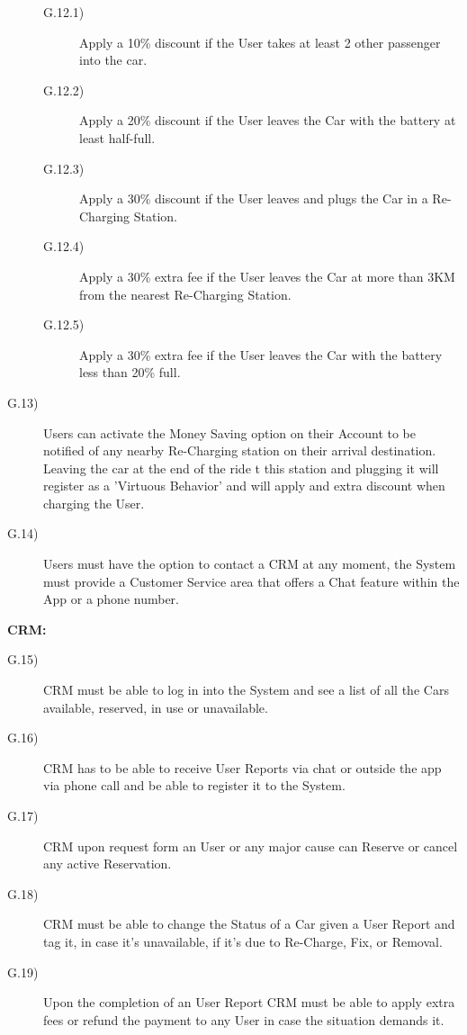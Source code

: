 \documentclass[a4paper]{article}
\begin{document}
\begin{description}
\begin{description}
\item [G.12.1)]Apply a 10\% discount if the User takes at least 2 other passenger into the car.
\item [G.12.2)]Apply a 20\% discount if the User leaves the Car with the battery at least half-full.
\item [G.12.3)]Apply a 30\% discount if the User leaves and plugs the Car in a Re-Charging Station.
\item [G.12.4)]Apply a 30\% extra fee if the User leaves the Car at more than 3KM from the nearest Re-Charging Station.
\item [G.12.5)]Apply a 30\% extra fee if the User leaves the Car with the battery less than 20\% full.
\end{description}
\item [G.13)]Users can activate the Money Saving option on their Account to be notified of any nearby Re-Charging station on their arrival destination. Leaving the car at the end of the ride t this station and plugging it will register as a 'Virtuous Behavior' and will apply and extra discount when charging the User.
\item [G.14)]Users must have the option to contact a CRM at any moment, the System must provide a Customer Service area that offers a Chat feature within the App or a phone number.
\end{description}
\textbf{CRM:}
\begin{description}
\item [G.15)]CRM must be able to log in into the System and see a list of all the Cars available, reserved, in use or unavailable.
\item [G.16)]CRM has to be able to receive User Reports via chat or outside the app via phone call and be able to register it to the System.
\item [G.17)]CRM upon request form an User or any major cause can Reserve or cancel any active Reservation.
\item [G.18)]CRM must be able to change the Status of a Car given a User Report and tag it, in case it's unavailable, if it's due to Re-Charge, Fix, or Removal.
\item [G.19)]Upon the completion of an User Report CRM must be able to apply extra fees or refund the payment to any User in case the situation demands it.
\end {description}
\end{document}
